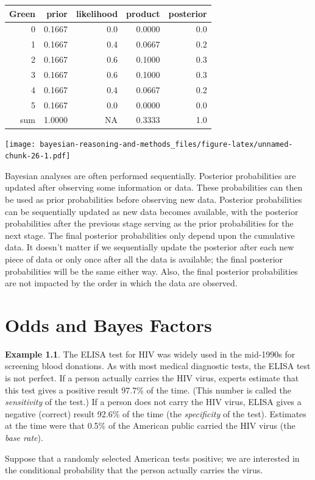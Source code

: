\documentclass[
]{book}
\theoremstyle{definition}
\theoremstyle{definition}
\newtheorem{example}{Example}[chapter]
\theoremstyle{definition}
\theoremstyle{remark}
\begin{document}
\begin{tabular}{r|r|r|r|r}
\hline
Green & prior & likelihood & product & posterior\\
\hline
0 & 0.1667 & 0.0 & 0.0000 & 0.0\\
\hline
1 & 0.1667 & 0.4 & 0.0667 & 0.2\\
\hline
2 & 0.1667 & 0.6 & 0.1000 & 0.3\\
\hline
3 & 0.1667 & 0.6 & 0.1000 & 0.3\\
\hline
4 & 0.1667 & 0.4 & 0.0667 & 0.2\\
\hline
5 & 0.1667 & 0.0 & 0.0000 & 0.0\\
\hline
sum & 1.0000 & NA & 0.3333 & 1.0\\
\hline
\end{tabular}

\texttt{[image: bayesian-reasoning-and-methods\_files/figure-latex/unnamed-chunk-26-1.pdf]}

Bayesian analyses are often performed sequentially.
Posterior probabilities are updated after observing some information or data.
These probabilities can then be used as prior probabilities before observing new data.
Posterior probabilities can be sequentially updated as new data becomes available, with the posterior probabilities after the previous stage serving as the prior probabilities for the next stage.
The final posterior probabilities only depend upon the cumulative data. It doesn't matter if we sequentially update the posterior after each new piece of data or only once after all the data is available; the final posterior probabilities will be the same either way.
Also, the final posterior probabilities are not impacted by the order in which the data are observed.

\hypertarget{bayes-factor}{%
\chapter{Odds and Bayes Factors}\label{bayes-factor}}

\begin{example}
\protect\hypertarget{exm:bayes-false-positive}{}{\label{exm:bayes-false-positive} }
The ELISA test for HIV was widely used in the mid-1990s for screening blood donations. As with most medical diagnostic tests, the ELISA test is not perfect. If a person actually carries the HIV virus, experts estimate that this test gives a positive result 97.7\% of the time. (This number is called the \emph{sensitivity} of the test.) If a person does not carry the HIV virus, ELISA gives a negative (correct) result 92.6\% of the time (the \emph{specificity} of the test). Estimates at the time were that 0.5\% of the American public carried the HIV virus (the \emph{base rate}).

Suppose that a randomly selected American tests positive; we are interested in the conditional probability that the person actually carries the virus.
\end{example}
\end{document}
